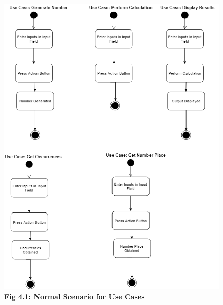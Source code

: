 \documentclass[paper=a4, fontsize=11pt]{report}
\numberwithin{equation}{section}		%
\numberwithin{figure}{section}			%
\numberwithin{table}{section}				%
\begin{document}
\pagebreak
\begin{figure}[htp]
    \centering
    \includegraphics[width=15cm]{NormalScenario1.png}
    \caption*{\textbf{Fig 4.1: Normal Scenario for Use Cases}}
\end{figure}
\end{document}
